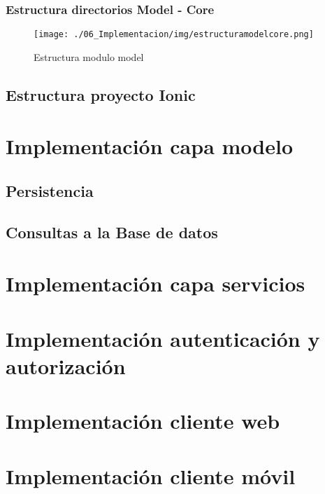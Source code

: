 \subsubsection*{Estructura directorios Model - Core}
\begin{figure}[H]
\centering
\texttt{[image: ./06\_Implementacion/img/estructuramodelcore.png]}
\caption{Estructura modulo model}
\end{figure}

\subsection{Estructura proyecto Ionic}


\section{Implementación capa modelo}


\subsection{Persistencia}


\subsection{Consultas a la Base de datos}


\section{Implementación capa servicios}


\section{Implementación autenticación y autorización}


\section{Implementación cliente web}


\section{Implementación cliente móvil}
